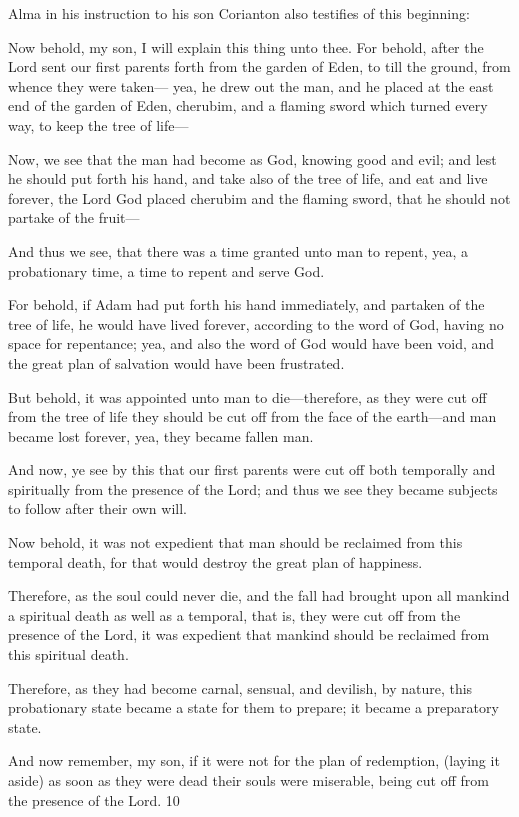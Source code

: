 Alma in his instruction to his son Corianton also testifies of this beginning:

Now behold, my son, I will explain this thing unto thee. For behold, after the Lord sent our
first parents forth from the garden of Eden, to till the ground, from whence they were taken—
yea, he drew out the man, and he placed at the east end of the garden of Eden, cherubim, and
a flaming sword which turned every way, to keep the tree of life—

Now, we see that the man had become as God, knowing good and evil; and lest he should put
forth his hand, and take also of the tree of life, and eat and live forever, the Lord God placed
cherubim and the flaming sword, that he should not partake of the fruit—

And thus we see, that there was a time granted unto man to repent, yea, a probationary time,
a time to repent and serve God.

For behold, if Adam had put forth his hand immediately, and partaken of the tree of life, he
would have lived forever, according to the word of God, having no space for repentance; yea,
and also the word of God would have been void, and the great plan of salvation would have
been frustrated.

But behold, it was appointed unto man to die—therefore, as they were cut off from the tree of
life they should be cut off from the face of the earth—and man became lost forever, yea, they
became fallen man.

And now, ye see by this that our first parents were cut off both temporally and spiritually
from the presence of the Lord; and thus we see they became subjects to follow after their
own will.

Now behold, it was not expedient that man should be reclaimed from this temporal death, for
that would destroy the great plan of happiness.

Therefore, as the soul could never die, and the fall had brought upon all mankind a spiritual
death as well as a temporal, that is, they were cut off from the presence of the Lord, it was
expedient that mankind should be reclaimed from this spiritual death.

Therefore, as they had become carnal, sensual, and devilish, by nature, this probationary state
became a state for them to prepare; it became a preparatory state.

And now remember, my son, if it were not for the plan of redemption, (laying it aside) as
soon as they were dead their souls were miserable, being cut off from the presence of the
Lord. 10

